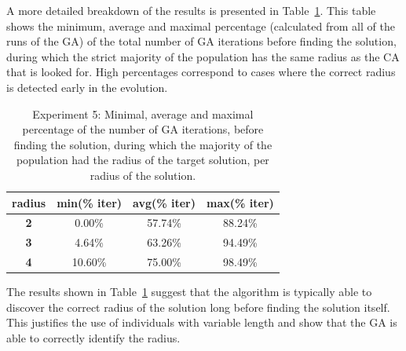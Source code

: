 A more detailed breakdown of the results is presented in Table~\ref{tab:exp4-perc}. This table shows the minimum, average and maximal percentage (calculated from all of the runs of the GA) of the total number of GA iterations before finding the solution, during which the strict majority of the population has the same radius as the CA that is looked for. High percentages correspond to cases where the correct radius is detected early in the evolution.
\begin{table}[ht]
	\centering
	\caption{Experiment 5: Minimal, average and maximal percentage of the number of GA iterations, before finding the solution, during which the majority of the population had the radius of the target solution, per radius of the solution.}\label{tab:exp4-perc}
	\begin{tabular}{c|c|c|c}
		{\bf radius} & {\bf min(\% iter)} & {\bf avg(\% iter)} & {\bf max(\% iter)} \\ \hline
		{\bf 2}      & 0.00\%             & 57.74\%            & 88.24\%            \\
		{\bf 3}      & 4.64\%             & 63.26\%            & 94.49\%            \\
		{\bf 4}      & 10.60\%            & 75.00\%            & 98.49\%
	\end{tabular}
\end{table}

The results shown in Table~\ref{tab:exp4-perc} suggest that the algorithm is typically able to discover the correct radius of the solution long before finding the solution itself. This justifies the use of individuals with variable length and show that the GA is able to correctly identify the radius.
